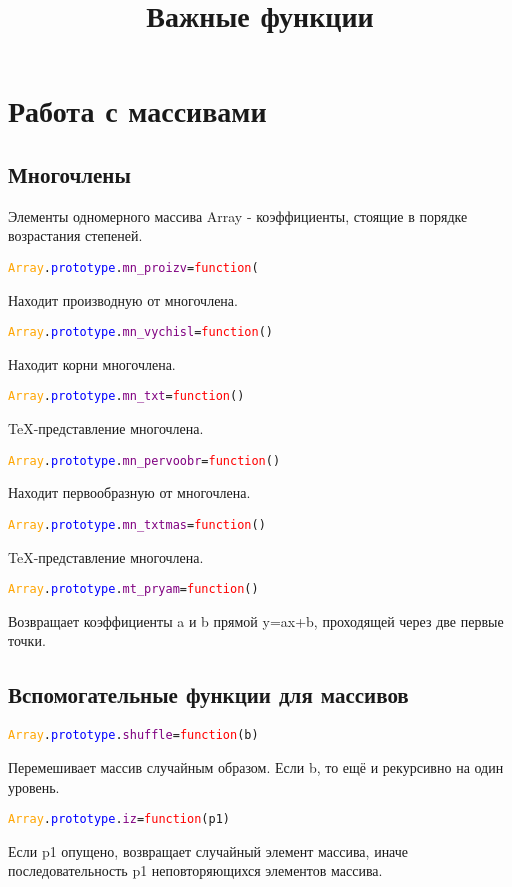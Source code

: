 \documentclass[a4paper,12pt]{article}
\begin{document}
	
	\title{Важные функции}
	\section{Работа с массивами}
		\subsection{Многочлены}
		Элементы одномерного массива Array - коэффициенты, стоящие в порядке возрастания степеней.
			\begin{alltt}
				\textcolor{Orange}{Array}.\textcolor{Blue}{prototype}.\textcolor{Purple}{mn_proizv}=\textcolor{Red}{function}(
			\end{alltt}
		Находит производную от многочлена. 
			\begin{alltt}
				\textcolor{Orange}{Array}.\textcolor{Blue}{prototype}.\textcolor{Purple}{mn_vychisl}=\textcolor{Red}{function}()
			\end{alltt}
		Находит корни многочлена.
			\begin{alltt}
				\textcolor{Orange}{Array}.\textcolor{Blue}{prototype}.\textcolor{Purple}{mn_txt}=\textcolor{Red}{function}()
			\end{alltt}
		TeX-представление многочлена.%
			\begin{alltt}
				\textcolor{Orange}{Array}.\textcolor{Blue}{prototype}.\textcolor{Purple}{mn_pervoobr}=\textcolor{Red}{function}()
			\end{alltt}
		Находит первообразную от многочлена.%
			\begin{alltt}
				\textcolor{Orange}{Array}.\textcolor{Blue}{prototype}.\textcolor{Purple}{mn_txtmas}=\textcolor{Red}{function}()
			\end{alltt}
		TeX-представление многочлена.
			\begin{alltt}
				\textcolor{Orange}{Array}.\textcolor{Blue}{prototype}.\textcolor{Purple}{mt_pryam}=\textcolor{Red}{function}()
			\end{alltt}
		Возвращает коэффициенты a и b прямой y=ax+b, проходящей через две первые точки.
		\subsection{Вспомогательные функции для массивов}
			\begin{alltt}
				\textcolor{Orange}{Array}.\textcolor{Blue}{prototype}.\textcolor{Purple}{shuffle}=\textcolor{Red}{function}(b)
			\end{alltt}	
		Перемешивает массив случайным образом. Если b, то ещё и рекурсивно на один уровень.
			\begin{alltt}
				\textcolor{Orange}{Array}.\textcolor{Blue}{prototype}.\textcolor{Purple}{iz}=\textcolor{Red}{function}(p1)
			\end{alltt}
		Если p1 опущено, возвращает случайный элемент массива, иначе последовательность p1 неповторяющихся элементов массива.
\end{document}
